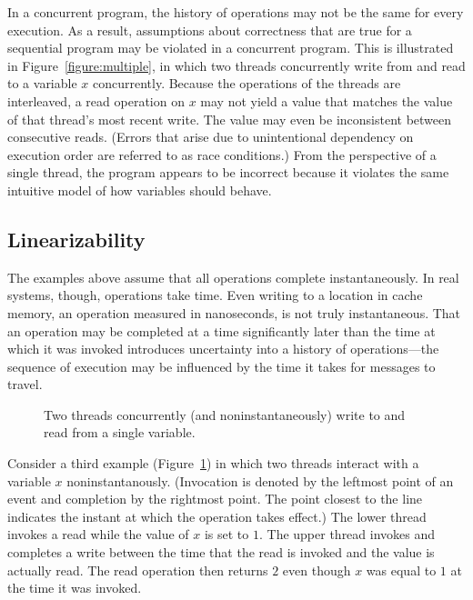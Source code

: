 \documentclass{sig-alternate}
\begin{document}
In a concurrent program, the history of operations may not be the same for every execution. As a result, assumptions about correctness that are true for a sequential program may be violated in a concurrent program. This is illustrated in Figure~\ref{figure:multiple}, in which two threads concurrently write from and read to a variable $x$ concurrently. Because the operations of the threads are interleaved, a read operation on $x$ may not yield a value that matches the value of that thread's most recent write. The value may even be inconsistent between consecutive reads. (Errors that arise due to unintentional dependency on execution order are referred to as race conditions.) From the perspective of a single thread, the program appears to be incorrect because it violates the same intuitive model of how variables should behave.

\subsection{Linearizability}

The examples above assume that all operations complete instantaneously. In real systems, though, operations take time. Even writing to a location in cache memory, an operation measured in nanoseconds, is not truly instantaneous. That an operation may be completed at a time significantly later than the time at which it was invoked introduces uncertainty into a history of operations---the sequence of execution may be influenced by the time it takes for messages to travel.

\begin{figure}[h]
  \centering
  \caption{Two threads concurrently (and noninstantaneously) write to and read from a single variable.}
\label{figure:time}
\end{figure}

Consider a third example (Figure~\ref{figure:time}) in which two threads interact with a variable $x$ noninstantanously. (Invocation is denoted by the leftmost point of an event and completion by the rightmost point. The point closest to the line indicates the instant at which the operation takes effect.) The lower thread invokes a read while the value of $x$ is set to $1$. The upper thread invokes and completes a write between the time that the read is invoked and the value is actually read. The read operation then returns $2$ even though $x$ was equal to $1$ at the time it was invoked.
\end{document}
